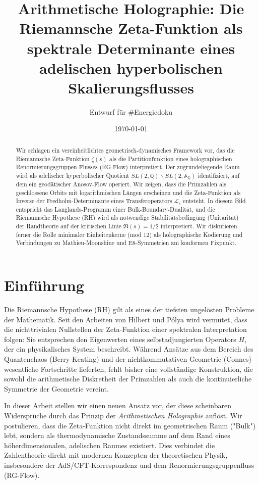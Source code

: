 \documentclass[11pt, a4paper]{article}
\title{\textbf{Arithmetische Holographie: Die Riemannsche Zeta-Funktion als spektrale Determinante eines adelischen hyperbolischen Skalierungsflusses}}
\author{Entwurf für \#Energiedoku}
\date{\today}
\begin{document}
	
	\maketitle
	
	\begin{abstract}
		\noindent
		Wir schlagen ein vereinheitlichtes geometrisch-dynamisches Framework vor, das die Riemannsche Zeta-Funktion $\zeta(s)$ als die Partitionfunktion eines holographischen Renormierungsgruppen-Flusses (RG-Flow) interpretiert. Der zugrundeliegende Raum wird als adelischer hyperbolischer Quotient $SL(2, \mathbb{Q}) \backslash SL(2, \mathbb{A}_{\mathbb{Q}})$ identifiziert, auf dem ein geodätischer Anosov-Flow operiert. Wir zeigen, dass die Primzahlen als geschlossene Orbits mit logarithmischen Längen erscheinen und die Zeta-Funktion als Inverse der Fredholm-Determinante eines Transferoperators $\mathcal{L}_s$ entsteht. In diesem Bild entspricht das Langlands-Programm einer Bulk-Boundary-Dualität, und die Riemannsche Hypothese (RH) wird als notwendige Stabilitätsbedingung (Unitarität) der Randtheorie auf der kritischen Linie $\Re(s)=1/2$ interpretiert. Wir diskutieren ferner die Rolle minimaler Einheitenkerne (mod 12) als holographische Kodierung und Verbindungen zu Mathieu-Moonshine und E8-Symmetrien am konformen Fixpunkt.
	\end{abstract}
	
	\tableofcontents
	\newpage
	
	\section{Einführung}
	
	Die Riemannsche Hypothese (RH) gilt als eines der tiefsten ungelösten Probleme der Mathematik. Seit den Arbeiten von Hilbert und Pólya wird vermutet, dass die nichttrivialen Nullstellen der Zeta-Funktion einer spektralen Interpretation folgen: Sie entsprechen den Eigenwerten eines selbstadjungierten Operators $H$, der ein physikalisches System beschreibt. Während Ansätze aus dem Bereich des Quantenchaos (Berry-Keating) und der nichtkommutativen Geometrie (Connes) wesentliche Fortschritte lieferten, fehlt bisher eine vollständige Konstruktion, die sowohl die arithmetische Diskretheit der Primzahlen als auch die kontinuierliche Symmetrie der Geometrie vereint.
	
	In dieser Arbeit stellen wir einen neuen Ansatz vor, der diese scheinbaren Widersprüche durch das Prinzip der \textit{Arithmetischen Holographie} auflöst. Wir postulieren, dass die Zeta-Funktion nicht direkt im geometrischen Raum ("Bulk") lebt, sondern als thermodynamische Zustandssumme auf dem Rand eines höherdimensionalen, adelischen Raumes existiert. Dies verbindet die Zahlentheorie direkt mit modernen Konzepten der theoretischen Physik, insbesondere der AdS/CFT-Korrespondenz und dem Renormierungsgruppenfluss (RG-Flow).
	
\end{document}
